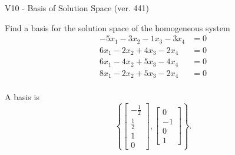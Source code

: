 \begin{exercise}
  \begin{exerciseTitle}V10 - Basis of Solution Space (ver. 441)\end{exerciseTitle}
  \begin{exerciseStatement}
    Find a basis for the solution space of the homogeneous system 
\begin{align*}
 -5 x_ 1 -3 x_ 2 -1 x_ 3 -3 x_ 4 &= 0  \\ 
  6 x_ 1 -2 x_ 2 + 4 x_ 3 -2 x_ 4 &= 0  \\ 
  6 x_ 1 -4 x_ 2 + 5 x_ 3 -4 x_ 4 &= 0  \\ 
  8 x_ 1 -2 x_ 2 + 5 x_ 3 -2 x_ 4 &= 0  \\ 
 \end{align*}


 
  \end{exerciseStatement}

  \begin{exerciseAnswer}
   A basis is   
\[\left\{\left[\begin{array}{c}
-\frac{1}{2} \\
\frac{1}{2} \\
1 \\
0
\end{array}\right] , \left[\begin{array}{c}
0 \\
-1 \\
0 \\
1
\end{array}\right]\right\}.\]

  


  \end{exerciseAnswer}
\end{exercise}